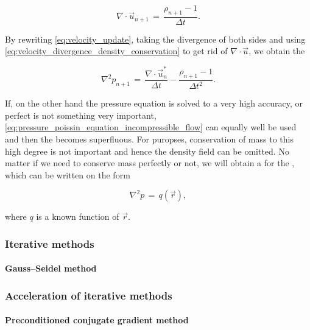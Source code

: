 \begin{equation} \label{eq:velocity_divergence_density_conservation}
\nabla\cdot\vec{u}_{n+1} \,=\, \frac{\rho_{n+1}-1}{\Delta t}.
\end{equation}

By rewriting \eqref{eq:velocity_update}, taking the divergence of both sides and using \eqref{eq:velocity_divergence_density_conservation} to get rid of $\nabla\cdot\vec{u}$, we obtain the 

\begin{equation} \label{eq:pressure_poissin_equation_density_conservation}
\nabla^2 p_{n+1} \,=\, \frac{\nabla\cdot\vec{u}^*_n}{\Delta t} - \frac{\rho_{n+1} - 1}{\Delta t^2}.
\end{equation}

If, on the other hand the pressure equation is solved to a very high accuracy, or perfect  is not something very important, \eqref{eq:pressure_poissin_equation_incompressible_flow} can equally well be used and then the  becomes superfluous. For \simulation puropses, conservation of mass to this high degree is not important and hence the density field can be omitted. No matter if we need to conserve mass perfectly or not, we will obtain a  for the , which can be written on the form

\begin{equation} \label{eq:pressure_poissin_equation_general}
\nabla^2 p \,=\, q(\vec{r}),
\end{equation}

where $q$ is a known function of $\vec{r}$.

\subsubsection{Iterative methods}

\paragraph{Gauss--Seidel method}

\subsubsection{Acceleration of iterative methods}

\paragraph{Preconditioned conjugate gradient method}

